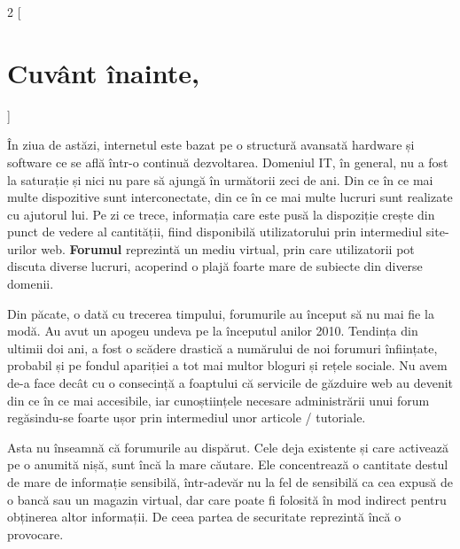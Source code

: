 \thispagestyle{empty}
\begin{multicols}{2}
[
\section*{Cuvânt înainte,}
]
\footnotesize {
În ziua de astăzi, internetul este bazat pe o structură avansată hardware și software ce se află într-o continuă dezvoltarea. Domeniul IT, în general, nu a fost la saturație și nici nu pare să ajungă în următorii zeci de ani. Din ce în ce mai multe dispozitive sunt interconectate, din ce în ce mai multe lucruri sunt realizate cu ajutorul lui. Pe zi ce trece, informația care este pusă la dispoziție crește din punct de vedere al cantității, fiind disponibilă utilizatorului prin intermediul site-urilor web. \textbf{Forumul} reprezintă un mediu virtual, prin care utilizatorii pot discuta diverse lucruri, acoperind o plajă foarte mare de subiecte din diverse domenii.

Din păcate, o dată cu trecerea timpului, forumurile au început să nu mai fie la modă. Au avut un apogeu undeva pe la începutul anilor 2010.
Tendința din ultimii doi ani, a fost o scădere drastică a numărului de noi forumuri înființate, probabil și pe fondul apariției a tot mai multor bloguri și rețele sociale. Nu avem de-a face decât cu o consecință a foaptului că servicile de găzduire web au devenit din ce în ce mai accesibile, iar cunoștiințele necesare administrării unui forum regăsindu-se foarte ușor prin intermediul unor articole / tutoriale.

Asta nu înseamnă că forumurile au dispărut. Cele deja existente și care activează pe o anumită nișă, sunt încă la mare căutare. Ele concentrează o cantitate destul de mare de informație sensibilă, într-adevăr nu la fel de sensibilă ca cea expusă de o bancă sau un magazin virtual, dar care poate fi folosită în mod indirect pentru obținerea altor informații. De ceea partea de securitate reprezintă încă o provocare.
}
\end{multicols}

\vspace{1cm}

\begin{center}
\end{center}

\restoregeometry